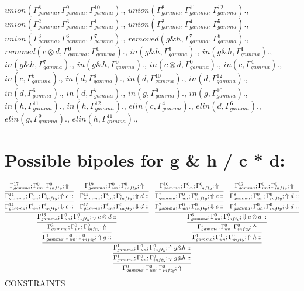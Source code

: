 \documentclass[a4paper, 11pt]{article}
\begin{document}
$union(\Gamma_{gamma}^{8}, \Gamma_{gamma}^{9}, \Gamma_{gamma}^{10}).$, $union(\Gamma_{gamma}^{8}, \Gamma_{gamma}^{11}, \Gamma_{gamma}^{12}).$, $union(\Gamma_{gamma}^{2}, \Gamma_{gamma}^{3}, \Gamma_{gamma}^{1}).$, $union(\Gamma_{gamma}^{2}, \Gamma_{gamma}^{4}, \Gamma_{gamma}^{5}).$, $union(\Gamma_{gamma}^{3}, \Gamma_{gamma}^{6}, \Gamma_{gamma}^{7}).$, $removed(g \binampersand h, \Gamma_{gamma}^{7}, \Gamma_{gamma}^{8}).$, $removed(c \otimes d, \Gamma_{gamma}^{0}, \Gamma_{gamma}^{1}).$, $in(g \binampersand h, \Gamma_{gamma}^{3}).$, $in(g \binampersand h, \Gamma_{gamma}^{1}).$, $in(g \binampersand h, \Gamma_{gamma}^{7}).$, $in(g \binampersand h, \Gamma_{gamma}^{0}).$, $in(c \otimes d, \Gamma_{gamma}^{0}).$, $in(c, \Gamma_{gamma}^{4}).$, $in(c, \Gamma_{gamma}^{5}).$, $in(d, \Gamma_{gamma}^{8}).$, $in(d, \Gamma_{gamma}^{10}).$, $in(d, \Gamma_{gamma}^{12}).$, $in(d, \Gamma_{gamma}^{6}).$, $in(d, \Gamma_{gamma}^{7}).$, $in(g, \Gamma_{gamma}^{9}).$, $in(g, \Gamma_{gamma}^{10}).$, $in(h, \Gamma_{gamma}^{11}).$, $in(h, \Gamma_{gamma}^{12}).$, $elin(c, \Gamma_{gamma}^{4}).$, $elin(d, \Gamma_{gamma}^{6}).$, $elin(g, \Gamma_{gamma}^{9}).$, $elin(h, \Gamma_{gamma}^{11}).$, 
\section{Possible bipoles for g \& h / c * d:} 

\[
\infer{\Gamma_{ gamma}^{0} ; \Gamma_{un}^{0} ; \Gamma_{ infty}^{0} ;  \Uparrow }
{\infer{\Gamma_{ gamma}^{1} ; \Gamma_{un}^{0} ; \Gamma_{ infty}^{0} ;  \Downarrow g \binampersand h :: }
{\infer{\Gamma_{ gamma}^{1} ; \Gamma_{un}^{0} ; \Gamma_{ infty}^{0} ;  \Uparrow g \binampersand h :: }
{\infer{\Gamma_{ gamma}^{1} ; \Gamma_{un}^{0} ; \Gamma_{ infty}^{0} ;  \Uparrow g :: }
{\infer{\Gamma_{ gamma}^{3} ; \Gamma_{un}^{0} ; \Gamma_{ infty}^{0} ;  \Uparrow }
{\infer{\Gamma_{ gamma}^{13} ; \Gamma_{un}^{0} ; \Gamma_{ infty}^{0} ;  \Downarrow c \otimes d :: }
{\infer{\Gamma_{ gamma}^{14} ; \Gamma_{un}^{0} ; \Gamma_{ infty}^{0} ;  \Downarrow c :: }
{\infer{\Gamma_{ gamma}^{14} ; \Gamma_{un}^{0} ; \Gamma_{ infty}^{0} ;  \Uparrow c :: }
{\Gamma_{ gamma}^{17} ; \Gamma_{un}^{0} ; \Gamma_{ infty}^{0} ;  \Uparrow }}
&
\infer{\Gamma_{ gamma}^{15} ; \Gamma_{un}^{0} ; \Gamma_{ infty}^{0} ;  \Downarrow d :: }
{\infer{\Gamma_{ gamma}^{15} ; \Gamma_{un}^{0} ; \Gamma_{ infty}^{0} ;  \Uparrow d :: }
{\Gamma_{ gamma}^{19} ; \Gamma_{un}^{0} ; \Gamma_{ infty}^{0} ;  \Uparrow }}}}}
&
\infer{\Gamma_{ gamma}^{1} ; \Gamma_{un}^{0} ; \Gamma_{ infty}^{0} ;  \Uparrow h :: }
{\infer{\Gamma_{ gamma}^{5} ; \Gamma_{un}^{0} ; \Gamma_{ infty}^{0} ;  \Uparrow }
{\infer{\Gamma_{ gamma}^{6} ; \Gamma_{un}^{0} ; \Gamma_{ infty}^{0} ;  \Downarrow c \otimes d :: }
{\infer{\Gamma_{ gamma}^{7} ; \Gamma_{un}^{0} ; \Gamma_{ infty}^{0} ;  \Downarrow c :: }
{\infer{\Gamma_{ gamma}^{7} ; \Gamma_{un}^{0} ; \Gamma_{ infty}^{0} ;  \Uparrow c :: }
{\Gamma_{ gamma}^{10} ; \Gamma_{un}^{0} ; \Gamma_{ infty}^{0} ;  \Uparrow }}
&
\infer{\Gamma_{ gamma}^{8} ; \Gamma_{un}^{0} ; \Gamma_{ infty}^{0} ;  \Downarrow d :: }
{\infer{\Gamma_{ gamma}^{8} ; \Gamma_{un}^{0} ; \Gamma_{ infty}^{0} ;  \Uparrow d :: }
{\Gamma_{ gamma}^{12} ; \Gamma_{un}^{0} ; \Gamma_{ infty}^{0} ;  \Uparrow }}}}}}}}
\]
CONSTRAINTS
\end{document}
